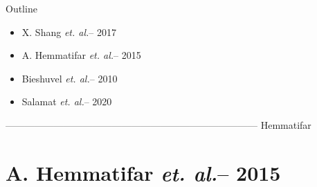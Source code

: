 \documentclass{beamer}
\title[\presentationTitleShort]{\presentationTitleLong}
\subtitle{\presentationSubTitle}
\newcommand{\etal}{{\it et. al.}}
\begin{document}

{
  \begin{frame}
    \maketitle
  \end{frame}
}


\begin{frame}{Outline}
  \begin{itemize}
  \item X. Shang \etal -- 2017
  \item A. Hemmatifar \etal -- 2015
  \item Bieshuvel \etal -- 2010
  \item Salamat \etal -- 2020
  \end{itemize}
\end{frame}



------------------------------------------------------------------------------
Hemmatifar
\section{A. Hemmatifar \etal -- 2015}


\end{document}
